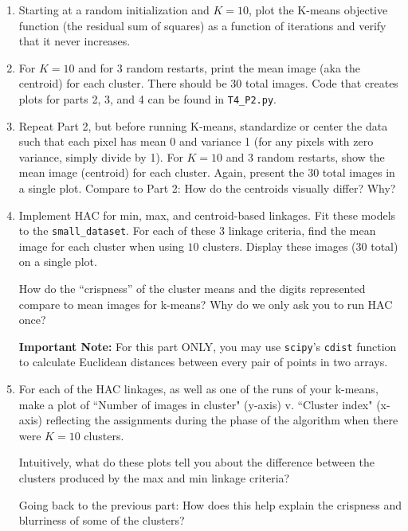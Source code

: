 \documentclass[submit]{harvardml}
\begin{document}
\begin{problem}
\begin{enumerate}

\item Starting at a random initialization and $K = 10$, plot the
  K-means objective function (the residual sum of squares) as a
  function of iterations and verify that it never increases.

\item For $K=10$ and for 3 random restarts, print the mean image (aka
  the centroid) for each cluster. There should be 30 total images. Code 
  that creates plots for parts 2, 3, and 4 can be found in \texttt{T4\_P2.py}.

\item Repeat Part 2, but before running K-means, standardize or center
  the data such that each pixel has mean 0 and variance 1 (for any
  pixels with zero variance, simply divide by 1). For $K=10$ and 3
  random restarts, show the mean image (centroid) for each
  cluster. Again, present the 30 total images in a single
  plot. Compare to Part 2: How do the centroids visually differ? Why?

\item Implement HAC for min, max, and centroid-based linkages. Fit
  these models to the \texttt{small\_dataset}.  For each of these 3
  linkage criteria, find the mean image for each cluster when using
  $10$ clusters. Display these images (30 total) on a single plot.

  How do the ``crispness'' of the cluster means and the digits
  represented compare to mean images for k-means?  
  Why do we only ask you to run HAC once?  

  \textbf{Important Note:} For this part ONLY, you may use
  \texttt{scipy}'s \texttt{cdist} function to calculate Euclidean
  distances between every pair of points in two arrays.

\item For each of the HAC linkages, as well as one of the runs of your
  k-means, make a plot of ``Number of images in cluster" (y-axis)
  v. ``Cluster index" (x-axis) reflecting the assignments during the
  phase of the algorithm when there were $K=10$ clusters.

  Intuitively, what do these plots tell you about the difference
  between the clusters produced by the max and min linkage criteria?

  Going back to the previous part: How does this help explain the
  crispness and blurriness of some of the clusters?  
\end{enumerate}
\end{problem}
\end{document}
